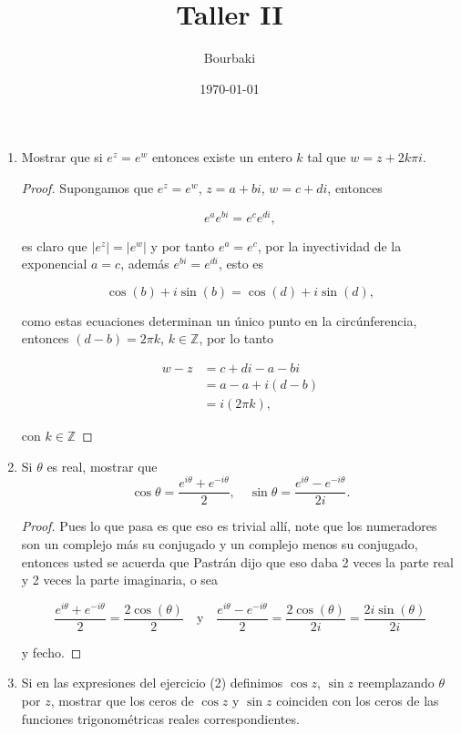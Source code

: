 \documentclass[11pt]{article}
\title{Taller II}
\author{Bourbaki}
\date{\today}
\begin{document}
\maketitle

\begin{enumerate}
    \item Mostrar que si $e^z = e^w$ entonces existe un entero $k$ tal que $w = z + 2k\pi i$.\\

    \begin{proof}
    Supongamos que $e^z=e^w$, $z=a+bi$, $w=c+di$, entonces

    $$e^{a}e^{bi}=e^{c}e^{di},$$

    es claro que $|e^z|=|e^w|$ y por tanto $e^a=e^c$, por la inyectividad de la exponencial $a=c$, además $e^{bi}=e^{di}$, esto es

    $$\cos(b)+i\sin(b)=\cos(d)+i\sin(d),$$ 

    como estas ecuaciones determinan un único punto en la circúnferencia, entonces $(d-b)=2\pi k$, $k\in \mathbb{Z}$, por lo tanto

    \begin{align*}
      w-z&=c+di-a-bi\\
        &=a-a+i(d-b)\\
        &=i(2\pi k)
    ,\end{align*}

con $k\in \mathbb{Z}$

    \end{proof}

    \item Si $\theta$ es real, mostrar que
    \[
    \cos \theta = \frac{e^{i \theta} + e^{-i \theta}}{2}, \quad \sin \theta = \frac{e^{i \theta} - e^{-i \theta}}{2i}.
    \]

    \begin{proof}
    Pues lo que pasa es que eso es trivial allí, note que los numeradores son un complejo más su conjugado y un complejo menos su conjugado, entonces usted se acuerda que Pastrán dijo que eso daba 2 veces la parte real y 2 veces la parte imaginaria,  o sea

    $$\frac{e^{i\theta}+e^{-i\theta}}{2}=\frac{2\cos(\theta)}{2} \quad \text{y}\quad \frac{e^{i\theta}-e^{-i\theta}}{2}=\frac{2\cos(\theta)}{2i}=\frac{2i\sin(\theta)}{2i}$$

    y fecho.
    \end{proof}

    \item Si en las expresiones del ejercicio (2) definimos $\cos z$, $\sin z$ reemplazando $\theta$ por $z$, mostrar que los ceros de $\cos z$ y $\sin z$ coinciden con los ceros de las funciones trigonométricas reales correspondientes.


\end{enumerate}
\end{document}
